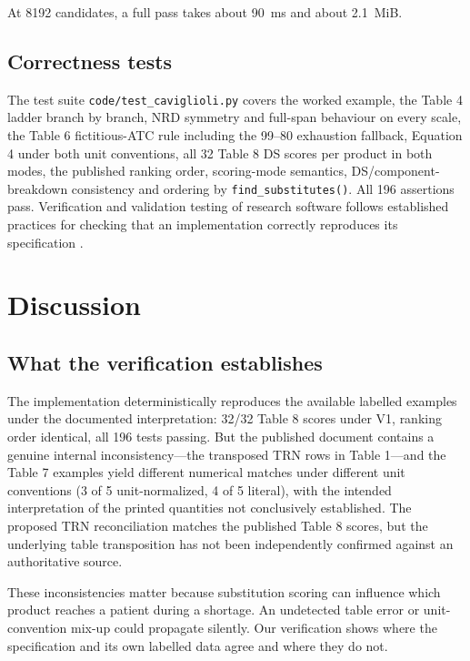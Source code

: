 \documentclass[a4paper]{elsarticle}
\begin{document}
At 8192 candidates, a full pass takes about 90~ms and about 2.1~MiB.

\subsection{Correctness tests}
\label{sec:tests}

The test suite \texttt{code/test\_caviglioli.py} covers the worked example, the Table 4 ladder branch by branch, NRD symmetry and full-span behaviour on every scale, the Table 6 fictitious-ATC rule including the 99--80 exhaustion fallback, Equation 4 under both unit conventions, all 32 Table 8 DS scores per product in both modes, the published ranking order, scoring-mode semantics, DS/component-breakdown consistency and ordering by \mbox{\texttt{find\_substitutes()}}. All 196 assertions pass. Verification and validation testing of research software follows established practices for checking that an implementation correctly reproduces its specification \citep{taschuk2017ten,wilson2017good,stodden2014best}.

\section{Discussion}
\label{sec:discussion}

\subsection{What the verification establishes}
\label{sec:discussion-verification}

The implementation deterministically reproduces the available labelled examples under the documented interpretation: 32/32 Table 8 scores under V1, ranking order identical, all 196 tests passing. But the published document contains a genuine internal inconsistency---the transposed TRN rows in Table 1---and the Table 7 examples yield different numerical matches under different unit conventions (3 of 5 unit-normalized, 4 of 5 literal), with the intended interpretation of the printed quantities not conclusively established. The proposed TRN reconciliation matches the published Table 8 scores, but the underlying table transposition has not been independently confirmed against an authoritative source.

These inconsistencies matter because substitution scoring can influence which product reaches a patient during a shortage. An undetected table error or unit-convention mix-up could propagate silently. Our verification shows where the specification and its own labelled data agree and where they do not.
\end{document}

